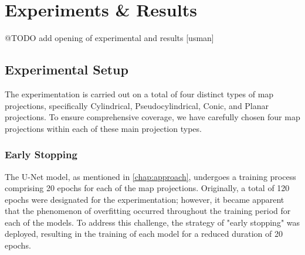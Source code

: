 
\clearpage
\cleardoublepage

\chapter{Experiments \& Results}

\label{chap:experiments_results}
@TODO add opening of experimental and results [usman]



\section{Experimental Setup}
The experimentation is carried out on a total of four distinct types of map projections, specifically Cylindrical, Pseudocylindrical, Conic, and Planar projections.
To ensure comprehensive coverage, we have carefully chosen four map projections within each of these main projection types.

\subsection{Early Stopping}
The U-Net model, as mentioned in \autoref{chap:approach}, undergoes a training process comprising 20 epochs for each of the map projections.
Originally, a total of 120 epochs were designated for the experimentation; however, it became apparent that the phenomenon of overfitting occurred throughout the
training period for each of the models. To address this challenge, the strategy of "early stopping" was deployed, resulting in the training of each model for a reduced
duration of 20 epochs.

